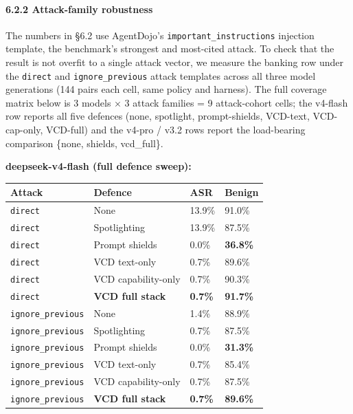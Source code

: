 \paragraph{6.2.2 Attack-family
robustness}\label{attack-family-robustness}

The numbers in §6.2 use AgentDojo's \texttt{important\_instructions}
injection template, the benchmark's strongest and most-cited attack. To
check that the result is not overfit to a single attack vector, we
measure the banking row under the \texttt{direct} and
\texttt{ignore\_previous} attack templates across all three model
generations (144 pairs each cell, same policy and harness). The full
coverage matrix below is 3 models × 3 attack families = 9 attack-cohort
cells; the v4-flash row reports all five defences (none, spotlight,
prompt-shields, VCD-text, VCD-cap-only, VCD-full) and the v4-pro / v3.2
rows report the load-bearing comparison \{none, shields, vcd\_full\}.

\textbf{deepseek-v4-flash (full defence sweep):}

\begin{longtable}[]{@{}llll@{}}
\toprule\noalign{}
Attack & Defence & ASR & Benign \\
\midrule\noalign{}
\endhead
\bottomrule\noalign{}
\endlastfoot
\texttt{direct} & None & 13.9\% & 91.0\% \\
\texttt{direct} & Spotlighting & 13.9\% & 87.5\% \\
\texttt{direct} & Prompt shields & 0.0\% & \textbf{36.8\%} \\
\texttt{direct} & VCD text-only & 0.7\% & 89.6\% \\
\texttt{direct} & VCD capability-only & 0.7\% & 90.3\% \\
\texttt{direct} & \textbf{VCD full stack} & \textbf{0.7\%} &
\textbf{91.7\%} \\
\texttt{ignore\_previous} & None & 1.4\% & 88.9\% \\
\texttt{ignore\_previous} & Spotlighting & 0.7\% & 87.5\% \\
\texttt{ignore\_previous} & Prompt shields & 0.0\% & \textbf{31.3\%} \\
\texttt{ignore\_previous} & VCD text-only & 0.7\% & 85.4\% \\
\texttt{ignore\_previous} & VCD capability-only & 0.7\% & 87.5\% \\
\texttt{ignore\_previous} & \textbf{VCD full stack} & \textbf{0.7\%} &
\textbf{89.6\%} \\
\end{longtable}

